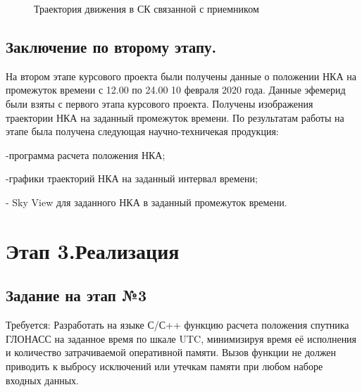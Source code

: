 \documentclass[]{article}
\begin{document}
	\begin{figure}[h!]
		
		\caption{Траектория движения в СК связанной с приемником }
		\label{skyv}
	\end{figure}
	
	\newpage
	\subsection{Заключение по второму этапу.}
	
	На втором этапе курсового проекта были получены данные о положении НКА на промежуток времени с 12.00 по 24.00 10 февраля 2020 года. Данные эфемерид были взяты с первого этапа курсового проекта. Получены изображения траектории НКА на заданный промежуток времени. По результатам работы на этапе была получена следующая научно-техничекая продукция:
	
	-программа расчета положения НКА;
	
	-графики траекторий НКА на заданный интервал времени;
	
	- Sky View для заданного НКА в заданный промежуток времени.

\newpage	
\section{Этап 3.Реализация}
\subsection{Задание на этап №3}
Требуется:
Разработать на языке С/С++ функцию расчета положения спутника ГЛОНАСС на заданное время по шкале UTC, минимизируя время её исполнения и количество затрачиваемой оперативной памяти. Вызов функции не должен приводить к выбросу исключений или утечкам памяти при любом наборе входных данных.
\end{document}
